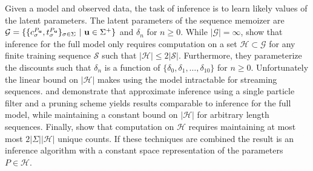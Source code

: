 Given a model and observed data,  the task of inference is to learn likely values of the latent parameters.  The latent parameters of the sequence memoizer are  $\mathcal{G} = \{ \{ c^{P_{\bf u}}_\sigma, t^{P_{\bf u}}_\sigma \}_{\sigma \in \Sigma} \ | \ {\bf u} \in \Sigma^{+} \}$  and $\delta_n$ for $n \geq 0$.  While $| \mathcal{G}| = \infty$, \citep{Wood2009} show that inference for the full model only requires computation on a set $\mathcal{H} \subset \mathcal{G}$ for any finite training sequence $\mathcal{S}$ such that $|\mathcal{H} | \leq 2 |\mathcal{S}|$.  Furthermore, they parameterize the discounts such that $\delta_n$ is a function of $\{\delta_0, \delta_1, \ldots, \delta_{10} \}$ for $n \geq 0$.   Unfortunately the linear bound on $|\mathcal{H}|$ makes using the model intractable for streaming sequences. \citep{Bartlett2010} and \citep{Gasthaus2010} demonstrate that approximate inference using a single particle filter and a pruning scheme yields results comparable to inference for the full model, while maintaining a constant bound on $|\mathcal{H}| $ for arbitrary length sequences.  Finally, \cite{Gasthaus2011} show that computation on $\mathcal{H}$ requires maintaining at most most $2|\Sigma| |\mathcal{H}|$ unique counts.  If these techniques are combined the result is an inference algorithm with a constant space representation of the parameters $P \in \mathcal{H}$.  


